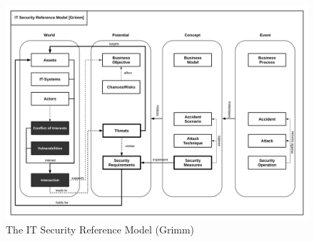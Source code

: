 \begin{figure}
\centering
\includegraphics[width=\textwidth]{diagrams/png/itsec-ref-model-grimm.png}
\caption{The IT Security Reference Model (Grimm)}
\label{fig:refmodel}
\end{figure}
